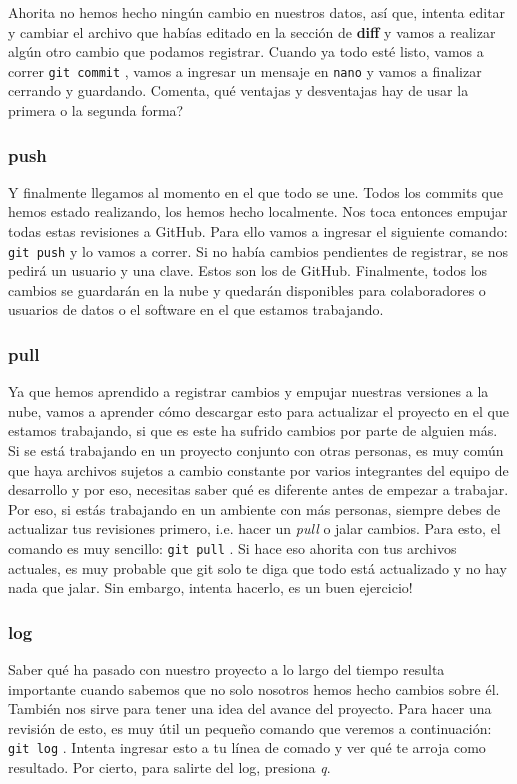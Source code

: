 \documentclass[10pt,letterpaper]{article}
\newcommand{\inlinecode}[1]{
\colorbox{light-gray}{\texttt{#1}}
}
\begin{document}
Ahorita no hemos hecho ning\'un cambio en nuestros datos, as\'i que, intenta editar y cambiar el archivo que hab\'ias editado en la secci\'on de \textbf{diff} y vamos a realizar alg\'un otro cambio que podamos registrar. Cuando ya todo est\'e listo, vamos a correr \inlinecode{git commit}, vamos a ingresar un mensaje en \inlinecode{nano} y vamos a finalizar cerrando y guardando. Comenta, qu\'e ventajas y desventajas hay de usar la primera o la segunda forma?

\subsubsection{push}
Y finalmente llegamos al momento en el que todo se une. Todos los commits que hemos estado realizando, los hemos hecho localmente. Nos toca entonces empujar todas estas revisiones a GitHub. Para ello vamos a ingresar el siguiente comando: \inlinecode{git push} y lo vamos a correr. Si no hab\'ia cambios pendientes de registrar, se nos pedir\'a un usuario y una clave. Estos son los de GitHub. Finalmente, todos los cambios se guardar\'an en la nube y quedar\'an disponibles para colaboradores o usuarios de datos o el software en el que estamos trabajando.

\subsubsection{pull}
Ya que hemos aprendido a registrar cambios y empujar nuestras versiones a la nube, vamos a aprender c\'omo descargar esto para actualizar el proyecto en el que estamos trabajando, si que es este ha sufrido cambios por parte de alguien m\'as. Si se est\'a trabajando en un proyecto conjunto con otras personas, es muy com\'un que haya archivos sujetos a cambio constante por varios integrantes del equipo de desarrollo y por eso, necesitas saber qu\'e es diferente antes de empezar a trabajar.\\

Por eso, si est\'as trabajando en un ambiente con m\'as personas, siempre debes de actualizar tus revisiones primero, i.e. hacer un \emph{pull} o jalar cambios. Para esto, el comando es muy sencillo: \inlinecode{git pull}. Si hace eso ahorita con tus archivos actuales, es muy probable que git solo te diga que todo est\'a actualizado y no hay nada que jalar. Sin embargo, intenta hacerlo, es un buen ejercicio!

\subsubsection{log}
Saber qu\'e ha pasado con nuestro proyecto a lo largo del tiempo resulta importante cuando sabemos que no solo nosotros hemos hecho cambios sobre \'el. Tambi\'en nos sirve para tener una idea del avance del proyecto. Para hacer una revisi\'on de esto, es muy \'util un peque\~no comando que veremos a continuaci\'on: \inlinecode{git log}. Intenta ingresar esto a tu l\'inea de comado y ver qu\'e te arroja como resultado. Por cierto, para salirte del log, presiona \emph{q}.\\
\end{document}
